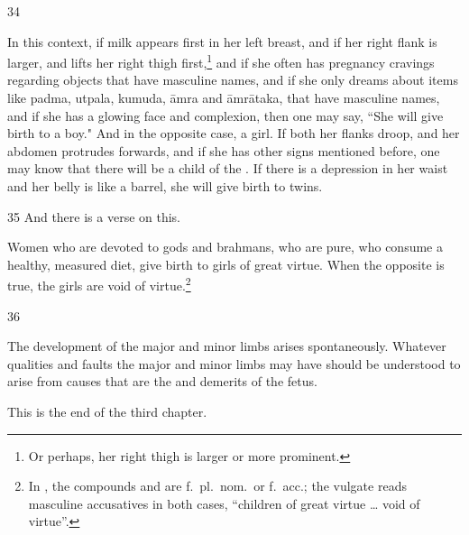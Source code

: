 \begin{translation}
\item[34]

In this context, if milk appears first in her left breast, and if her
right flank is larger, and lifts her right thigh first,\footnote{Or
    perhaps, her right thigh is larger or more prominent.} and if she
    often has pregnancy cravings regarding objects that have masculine
    names, and if she only dreams about items like \gls{padma},
    \gls{utpala}, \gls{kumuda}, \gls{āmra} and \gls{āmrātaka}, that have
    masculine names, and if she has a glowing face and complexion, then
    one may say, “She will give birth to a boy."  And in the opposite
    case, a girl. %
    If both her flanks droop, and her abdomen protrudes forwards, and
    if she has other signs mentioned before, one may know that there
    will be a child of the . If there is a
    depression in her waist and her belly is like a barrel, she will
    give birth to twins.
    
\item[35]    
And there is a verse on this.

\bigskip

Women who are devoted to gods and brahmans, who are pure, who consume
a healthy, measured diet, give birth to girls of great virtue. When
the opposite is true, the girls are void of virtue.\footnote{In
    , the compounds  and
     are f.\ pl.\ nom.\ or f.\ acc.; the vulgate reads
    masculine accusatives in both cases, “children of great virtue \ldots
    void of virtue”.}

\item[36]

The development of the major and minor limbs arises spontaneously.
Whatever qualities and faults the major and minor limbs may have
should be understood to arise from causes that are the
 and demerits of the fetus.



\bigskip

This is the end of the third chapter.

    
\end{translation}
